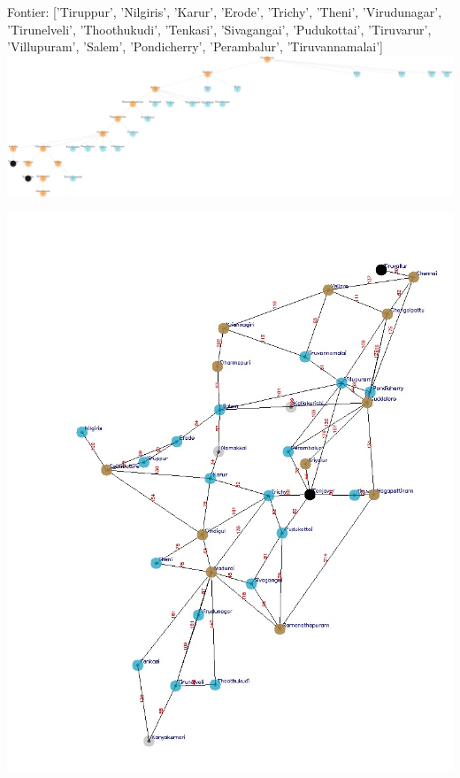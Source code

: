 \documentclass[xcolor=table]{beamer}
\begin{document}
\begin{frame}
  { \tiny Fontier: ['Tiruppur', 'Nilgiris', 'Karur', 'Erode', 'Trichy', 'Theni', 'Virudunagar', 'Tirunelveli', 'Thoothukudi', 'Tenkasi', 'Sivagangai', 'Pudukottai', 'Tiruvarur', 'Villupuram', 'Salem', 'Pondicherry', 'Perambalur', 'Tiruvannamalai']}
  \includegraphics[width=1\textwidth]{../DFSNodes/18-1.png}
  \begin{center}
    \includegraphics[height=0.45\textheight]{../DFSoutput/tamilDFS16.jpg}
  \end{center}
\end{frame}
\end{document}
